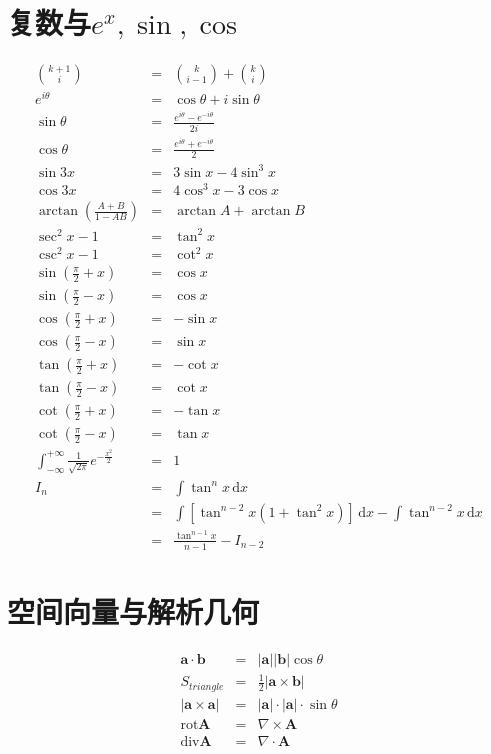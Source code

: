 \documentclass[UTF8]{ctexart}
\newcommand{\ud}{\,\mathrm{d}}
\begin{document}
\section{复数与$e^x,\sin,\cos$}
\begin{eqnarray*}
\binom{k+1}{i}&=&\binom{k}{i-1}+\binom{k}{i}\\
e^{i\theta} &=& \cos\theta +i\sin\theta\\
\sin \theta &=& \frac{e^{i\theta}-e^{-i\theta}}{2i}\\
\cos \theta &=& \frac{e^{i\theta}+e^{-i\theta}}{2}\\
\sin 3x &=& 3\sin x-4\sin^3 x\\
\cos 3x &=& 4\cos^3 x-3\cos x\\
\arctan\left(\frac{A+B}{1-AB}\right) &=& \arctan A+\arctan B\\
\sec^2x-1 &=& \tan^2x\\
\csc^2x-1 &=& \cot^2x\\
\sin(\frac{\pi}{2}+x) &=& \cos x\\
\sin(\frac{\pi}{2}-x) &=& \cos x\\
\cos(\frac{\pi}{2}+x) &=& -\sin x\\
\cos(\frac{\pi}{2}-x) &=& \sin x\\
\tan(\frac{\pi}{2}+x) &=& -\cot x\\
\tan(\frac{\pi}{2}-x) &=& \cot x\\
\cot(\frac{\pi}{2}+x) &=& -\tan x\\
\cot(\frac{\pi}{2}-x) &=& \tan x\\
\int_{-\infty}^{+\infty}\frac{1}{\sqrt{2\pi}}e^{-\frac{x^2}{2}} &=& 1\\
I_n&=&\int \tan^n x\ud{x}\\
&=& \int[\tan^{n-2}x (1+\tan^2x)]\ud{x}-\int\tan^{n-2}x \ud{x}\\
&=& \frac{\tan^{n-1}x}{n-1}-I_{n-2}
\end{eqnarray*}


\section{空间向量与解析几何}
\begin{eqnarray*}
\mathbf{a} \cdot \mathbf{b} &=& |\mathbf{a}| |\mathbf{b}| \cos \theta \\
S_{triangle} &=& \frac{1}{2}|\mathbf{a} \times \mathbf{b}| \\
|\mathbf{a}\times \mathbf{a}|&=&|\mathbf{a}|\cdot|\mathbf{a}|\cdot \sin \theta\\
\text{rot}\mathbf{A} & = & \nabla \times \mathbf{A}\\
\text{div}\mathbf{A} & = & \nabla \cdot \mathbf{A}
\end{eqnarray*}
\end{document}
